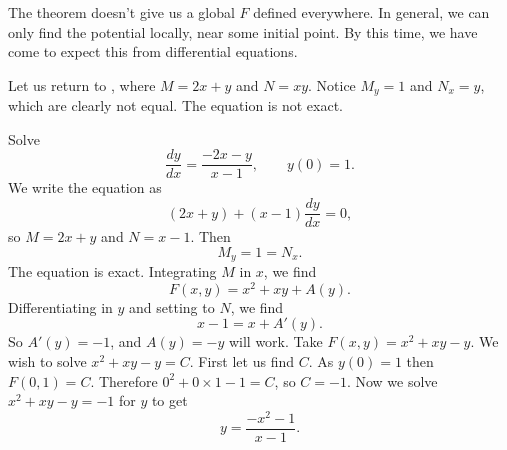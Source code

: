The theorem doesn't give us a global $F$ defined everywhere.  In
general, we can only find the potential locally, near some initial point.
By this time, we have come to expect this from differential
equations.

Let us return to , where $M = 2x + y$ and $N = xy$.  
Notice 
$M_y = 1$ and  $N_x =
y$, which are clearly not equal.  The equation is not exact.

\begin{example}
Solve
\begin{equation*}
\frac{dy}{dx} = \frac{-2x-y}{x-1}, \qquad y(0) = 1.
\end{equation*}
We write the equation as
\begin{equation*}
(2x+y) + (x-1)\frac{dy}{dx} = 0 ,
\end{equation*}
so $M = 2x+y$ and $N = x-1$.  Then
\begin{equation*}
M_y = 1 = N_x .
\end{equation*}
The equation is exact.
Integrating $M$ in $x$, we find
\begin{equation*}
F(x,y) = x^2+xy + A(y) .
\end{equation*}
Differentiating in $y$ and setting to $N$, we find
\begin{equation*}
x-1 = x + A'(y) .
\end{equation*}
So $A'(y) = -1$, and $A(y) = -y$ will work.  Take $F(x,y) = x^2+xy-y$.  We
wish to solve $x^2+xy-y = C$.  First let us find $C$.  As $y(0)=1$ then
$F(0,1) = C$.  Therefore $0^2+0\times 1 - 1 = C$, so $C=-1$.  Now we solve
$x^2+xy-y = -1$ for $y$ to get
\begin{equation*}
y = \frac{-x^2-1}{x-1} .
\end{equation*}
\end{example}

